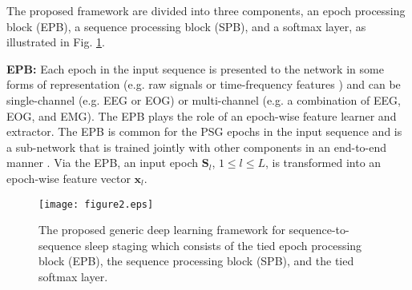 \documentclass[journal,twoside,web]{ieeecolor}
\begin{document}
The proposed framework are divided into three components, an epoch processing block (EPB), a sequence processing block (SPB), and a softmax layer, as illustrated  in Fig. \ref{fig:endtoend_seqtoseq}. 

{\bf EPB:} Each epoch in the input sequence is presented to the network in some forms of representation (e.g. raw signals \cite{Supratak2017} or time-frequency features \cite{Phan2019a}) and can be single-channel (e.g. EEG or EOG) or multi-channel (e.g. a combination of EEG, EOG, and EMG). The EPB plays the role of an epoch-wise feature learner and extractor. The EPB is common for the PSG epochs in the input sequence and is a sub-network that is trained jointly with other components in an end-to-end manner \cite{Phan2019a}. Via the EPB, an input epoch $\mathbf{S}_l$, $1 \le l \le L$, is transformed into an epoch-wise feature vector $\mathbf{x}_l$. 

\begin{figure} [!t]
	\centering
	\texttt{[image: figure2.eps]}
	\vspace{-0.1cm}
	\caption{The proposed generic deep learning framework for sequence-to-sequence sleep staging which consists of the tied epoch processing block (EPB), the sequence processing block (SPB), and the tied softmax layer.} 
	\label{fig:endtoend_seqtoseq}
	\vspace{-0.25cm}
\end{figure}
\end{document}
